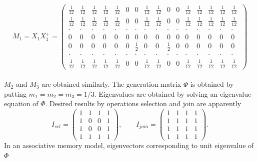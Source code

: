 {\footnotesize
\[ M_1 = X_1X_1^+ = \left(\begin{array}%
{cccccccccccccccc}
\frac{1}{12} & \frac{1}{12} & \frac{1}{12} & \frac{1}{12} & 
\frac{1}{12} & 0 & 0 & \frac{1}{12} & 
\frac{1}{12} & 0 & 0 & \frac{1}{12} & 
\frac{1}{12} & \frac{1}{12} & \frac{1}{12} & \frac{1}{12} \\ 
\frac{1}{12} & \frac{1}{12} & \frac{1}{12} & \frac{1}{12} & 
\frac{1}{12} & 0 & 0 & \frac{1}{12} & 
\frac{1}{12} & 0 & 0 & \frac{1}{12} & 
\frac{1}{12} & \frac{1}{12} & \frac{1}{12} & \frac{1}{12} \\ 
\cdot & \cdot & \cdot & \cdot & \cdot & \cdot & 
\cdot & \cdot & \cdot & \cdot & \cdot & \cdot & 
\cdot & \cdot & \cdot & \cdot \\
0 & 0 & 0 & 0 & 0 & 0 & 0 & 0 & 0 & 0 & 0 & 0 & 
0 & 0 & 0 & 0 \\
0 & 0 & 0 & 0 & 0 & 0 & \frac{1}{2} & 0 & 0 & \frac{1}{2} & 0 & 0 & 
0 & 0 & 0 & 0 \\
\cdot & \cdot & \cdot & \cdot & \cdot & \cdot & 
\cdot & \cdot & \cdot & \cdot & \cdot & \cdot & 
\cdot & \cdot & \cdot & \cdot \\
\frac{1}{12} & \frac{1}{12} & \frac{1}{12} & \frac{1}{12} & 
\frac{1}{12} & 0 & 0 & \frac{1}{12} & 
\frac{1}{12} & 0 & 0 & \frac{1}{12} & 
\frac{1}{12} & \frac{1}{12} & \frac{1}{12} & \frac{1}{12} 
\end{array} \ \right) \]
}
\ \\
$M_2$ and $M_3$ are obtained similarly.  
The generation matrix $\Phi$ is obtained by 
putting $m_1=m_2=m_3=1/3$.  Eigenvalues are obtained 
by solving an eigenvalue equation of $\Phi $.  
Desired results by operations selection and join 
are apparently 
$$ I_{sel} = \left( \begin{array}{cccc}
1 & 1 & 1 & 1 \\ 1 & 0 & 0 & 1 \\ 
1 & 0 & 0 & 1 \\ 1 & 1 & 1 & 1
\end{array} \right) , \qquad 
I_{join} = \left( \begin{array}{cccc}
1 & 1 & 1 & 1 \\ 1 & 1 & 1 & 1 \\ 
1 & 1 & 1 & 1 \\ 1 & 1 & 1 & 1
\end{array} \right). $$
In an associative memory model, eigenvectors 
corresponding to unit eigenvalue of $\Phi$ 
